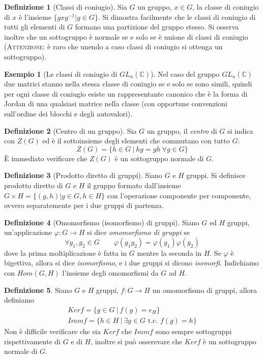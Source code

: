\documentclass[11pt]{article}
\theoremstyle{plain}
\theoremstyle{definition}
\newtheorem{defn}{Definizione}[section]
\newtheorem{exmp}{Esempio}[section]
\theoremstyle{remark}
\newcommand{\C}{\mathbb{C}}
\begin{document}
\begin{defn}[Classi di coniugio]
Sia $G$ un gruppo, $x \in G$, la classe di coniugio di $x$ è l'insieme $\{ gxg^{-1} | g\in G \}$. Si dimostra facilmente che le classi di coniugio di tutti gli elementi di $G$ formano una partizione del gruppo stesso. Si osserva inoltre che un sottogruppo è normale se e solo se è unione di classi di coniugio (\textsc{Attenzione:} è raro che unendo a caso classi di coniugio si ottenga un sottogruppo).
\end{defn}


\begin{exmp}[Le classi di coniugio di $GL_n(\C)$]
Nel caso del gruppo $GL_n(\C)$ due matrici stanno nella stessa classe di coniugio se e solo se sono simili, quindi per ogni classe di coniugio esiste un rappresentante canonico che è la forma di Jordan di una qualsiasi matrice nella classe (con opportune convenzioni sull'ordine dei blocchi e degli autovalori).
\end{exmp}

\begin{defn}[Centro di un gruppo]
	Sia $G$ un gruppo, il \textit{centro} di $G$ si indica con $Z(G)$ ed è il sottoinsieme degli elementi che commutano con tutto $G$:
	\[
		Z(G)=\{ h\in G\ |\ hg=gh\ \forall g\in G \}
	\]
	\`E immediato verificare che $Z(G)$ è un sottogruppo normale di $G$.

\end{defn}

\begin{defn}[Prodotto diretto di gruppi]
Siano $G$ e $H$ gruppi. Si definisce prodotto diretto di $G$ e $H$ il gruppo formato dall'insieme $G \times H = \{ (g, h) | g \in G, h \in H\}$ con l'operazione componente per componente, ovvero separatemente per i due gruppi di partenza.
\end{defn}


\begin{defn}[Omomorfismo (isomorfismo) di gruppi]
Siano $G$ ed $H$ gruppi, un'applicazione $\varphi:G\to H$ si dice \textit{omomorfismo di gruppi} se
\[
	\forall g_1,g_2\in G\qquad \varphi(g_1 g_2)=\varphi(g_1)\varphi(g_2)
\]
dove la prima moltiplicazione è fatta in $G$ mentre la seconda in $H$.
Se $\varphi$ è bigettiva, allora si dice \textit{isomorfismo}, e i due gruppi si dicono \emph{isomorfi}.
Indichiamo con $Hom(G,H)$ l'insieme degli omomorfismi da $G$ ad $H$.
\end{defn}

\begin{defn}
	Siano $G$ e $H$ gruppi, $f:G\to H$ un omomorfismo di gruppi, allora definiamo
	\begin{gather*}
		Ker f = \{g\in G\ |\ f(g)=e_H\}\\
		Imm f =\{ h\in H\ |\ \exists g\in G\text{ t.c. }f(g)=h\}
	\end{gather*}
	Non è difficile verificare che sia $Ker f$ che $Imm f$ sono sempre sottogruppi rispettivamente di $G$ e di $H$, inoltre si può osserevare che $Ker f$ è un sottogruppo normale di $G$.
\end{defn}
\end{document}
